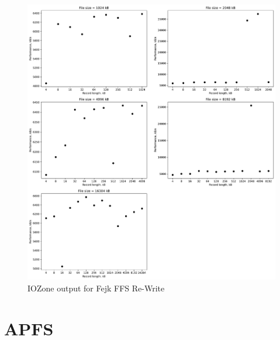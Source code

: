 \begin{figure}[!htb]
	\label{fig:app_bench_fffs_re_write}
	\begin{center}
		\includegraphics[width=1.0\textwidth]{figures/benchmarking/fake-ffs/Re-Write.pdf}
	\end{center}
	\caption{IOZone output for Fejk FFS Re-Write}
\end{figure}

\section{APFS}








